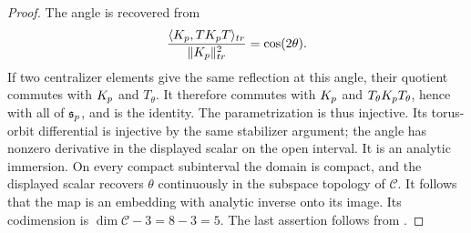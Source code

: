 \documentclass[10pt,a4paper]{amsart}
\begin{document}
\begin{proof}
The angle is recovered from
\[
\frac{\langle K_{\rm p},TK_{\rm p}T\rangle_{\rm tr}}{\|K_{\rm p}\|_{\rm tr}^2}=\cos(2\theta).
\]
If two centralizer elements give the same reflection at this angle, their quotient commutes with $K_{\rm p}$ and $T_\theta$.
It therefore commutes with $K_{\rm p}$ and $T_\theta K_{\rm p}T_\theta$, hence with all of $\mathfrak s_{\rm p}$, and is the identity.
The parametrization is thus injective.  Its torus-orbit differential is injective by the same stabilizer argument; the angle has nonzero derivative in the displayed scalar on the open interval.
It is an analytic immersion.  On every compact subinterval the domain is compact, and the displayed scalar recovers $\theta$ continuously in the subspace topology of $\mathscr C$.  It follows that the map is an embedding with analytic inverse onto its image.  Its codimension is $\dim\mathscr C-3=8-3=5$.
The last assertion follows from .
\end{proof}
\end{document}
